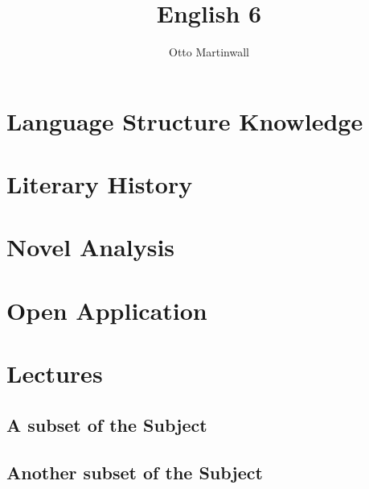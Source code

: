 

\title{English 6}
\author{Otto Martinwall}


\maketitle
\tableofcontents
\newpage

\section{Language Structure Knowledge}


\section{Literary History}


\section{Novel Analysis}


\section{Open Application}


\section{Lectures}
\subsection{A subset of the Subject}



\subsection{Another subset of the Subject}



